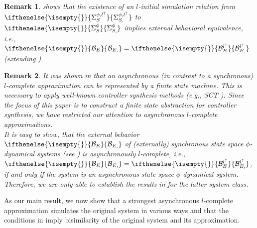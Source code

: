 \documentclass[letterpaper, 11 pt, onecolumn]{ieeeconf}
\newtheorem{remark}{Remark}
\newcommand{\smalllb}{\\[-0.25cm]}
\newcommand{\REFlem}[1]{\text{Lemma~\ref{#1}}}
\newcommand{\0}{\ensuremath{\emptyset}}
\newcommand{\Beh}{\ensuremath{\mathcal{B}}}
\newcommand{\BehE}[1]{\ensuremath{\ifthenelse{\isempty{#1}}{\Beh_{E}}{\Beh_{E,#1}}}}
\newcommand{\signalmap}{\phi}
\newcommand{\Ep}[1]{\ensuremath{\Sigma_{#1}^{\signalmap}}}
\newcommand{\EpS}[1]{\ensuremath{\ifthenelse{\isempty{#1}}{\Ep{S}}{\Ep{S,#1}}}}
\newcommand{\EplaMaxS}[1]{\ensuremath{\ifthenelse{\isempty{#1}}{\Sigma^{\signalmap,l^\uparrow}_{S}}{\Sigma^{\signalmap,l^\uparrow}_{S,#1}}}}
\newcommand{\BehlMaxE}[1]{\ensuremath{\ifthenelse{\isempty{#1}}{\Beh^{l^\uparrow}_{E}}{\Beh^{l^\uparrow}_{E,#1}}}}
\begin{document}
\begin{remark}
\REFlem{lem:EsLSimulatesElmaxSpi} shows that the existence of an $l$-initial simulation relation from $\EplaMaxS{}$ to $\EpS{}$ implies external behavioral equivalence, i.e., ${\BehE{}=\BehlMaxE{}}$ (extending \REFlem{lem:LinitSimImpliesOtherSims}).
\end{remark}

 \begin{remark}\label{rem:WhyAsyncSS}
  It was shown in \cite{SchmuckRaisch2014_ControlLetters} that an asynchronous (in contrast to a synchronous) $l$-complete approximation can be represented by a finite state machine. This is necessary to apply well-known controller synthesis methods (e.g., SCT \cite{RamWon1984}). Since the focus of this paper is to construct a finite state abstraction for controller synthesis, we have restricted our attention to asynchronous $l$-complete approximations.\\
  It is easy to show, that the external behavior $\BehE{}$ of (externally) synchronous state space $\signalmap$-dynamical systems (see \cite[Def.2]{SchmuckRaisch2014_ControlLetters}) is asynchronously $l$-complete, i.e., $\BehE{}=\BehlMaxE{}$, if and only if the system is an asynchronous state space $\signalmap$-dynamical system. Therefore, we are only able to establish the results in \REFlem{lem:EsLSimulatesElmaxSpi} for the latter system class. 
\end{remark}

As our main result, we now show that a strongest asynchronous $l$-complete approximation simulates the original system in various ways and that the conditions in \REFlem{lem:EsLSimulatesElmaxSpi} imply bisimilarity of the original system and its approximation.\smalllb
\end{document}
